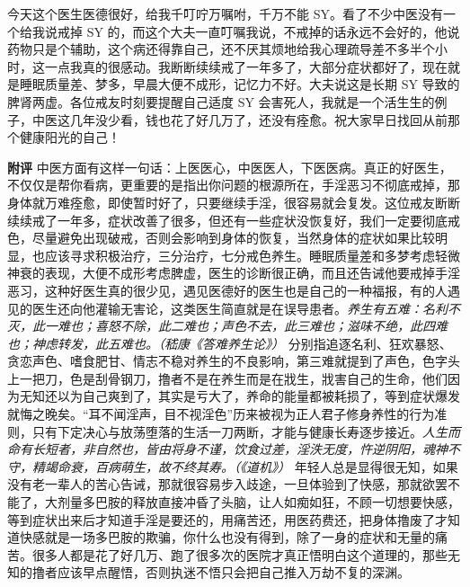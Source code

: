 \begin{case}
    今天这个医生医德很好，给我千叮咛万嘱咐，千万不能 SY。看了不少中医没有一个给我说戒掉 SY 的，而这个大夫一直叮嘱我说，不戒掉的话永远不会好的，他说药物只是个辅助，这个病还得靠自己，还不厌其烦地给我心理疏导差不多半个小时，这一点我真的很感动。我断断续续戒了一年多了，大部分症状都好了，现在就是睡眠质量差、梦多，早晨大便不成形，记忆力不好。大夫说这是长期 SY 导致的脾肾两虚。各位戒友时刻要提醒自己适度 SY 会害死人，我就是一个活生生的例子，中医这几年没少看，钱也花了好几万了，还没有痊愈。祝大家早日找回从前那个健康阳光的自己！

    \textbf{附评} 中医方面有这样一句话：上医医心，中医医人，下医医病。真正的好医生，不仅仅是帮你看病，更重要的是指出你问题的根源所在，手淫恶习不彻底戒掉，那身体就万难痊愈，即使暂时好了，只要继续手淫，很容易就会复发。这位戒友断断续续戒了一年多，症状改善了很多，但还有一些症状没恢复好，我们一定要彻底戒色，尽量避免出现破戒，否则会影响到身体的恢复，当然身体的症状如果比较明显，也应该寻求积极治疗，三分治疗，七分戒色养生。睡眠质量差和多梦考虑轻微神衰的表现，大便不成形考虑脾虚，医生的诊断很正确，而且还告诫他要戒掉手淫恶习，这种好医生真的很少见，遇见医德好的医生也是自己的一种福报，有的人遇见的医生还向他灌输无害论，这类医生简直就是在误导患者。\textit{养生有五难：名利不灭，此一难也；喜怒不除，此二难也；声色不去，此三难也；滋味不绝，此四难也；神虑转发，此五难也。（嵇康《答难养生论》）} 分别指追逐名利、狂欢暴怒、贪恋声色、嗜食肥甘、情志不稳对养生的不良影响，第三难就提到了声色，色字头上一把刀，色是刮骨钢刀，撸者不是在养生而是在戕生，戕害自己的生命，他们因为无知还以为自己爽到了，其实是亏大了，养命的能量都被耗损了，等到症状爆发就悔之晚矣。“耳不闻淫声，目不视淫色”历来被视为正人君子修身养性的行为准则，只有下定决心与放荡堕落的生活一刀两断，才能与健康长寿逐步接近。\textit{人生而命有长短者，非自然也，皆由将身不谨，饮食过差，淫泆无度，忤逆阴阳，魂神不守，精竭命衰，百病萌生，故不终其寿。（《道机》）} 年轻人总是显得很无知，如果没有老一辈人的苦心告诫，那就很容易步入歧途，一旦体验到了快感，那就欲罢不能了，大剂量多巴胺的释放直接冲昏了头脑，让人如痴如狂，不顾一切想要快感，等到症状出来后才知道手淫是要还的，用痛苦还，用医药费还，把身体撸废了才知道快感就是一场多巴胺的欺骗，你什么也没有得到，除了一身的症状和无量的痛苦。很多人都是花了好几万、跑了很多次的医院才真正悟明白这个道理的，那些无知的撸者应该早点醒悟，否则执迷不悟只会把自己推入万劫不复的深渊。
\end{case}

